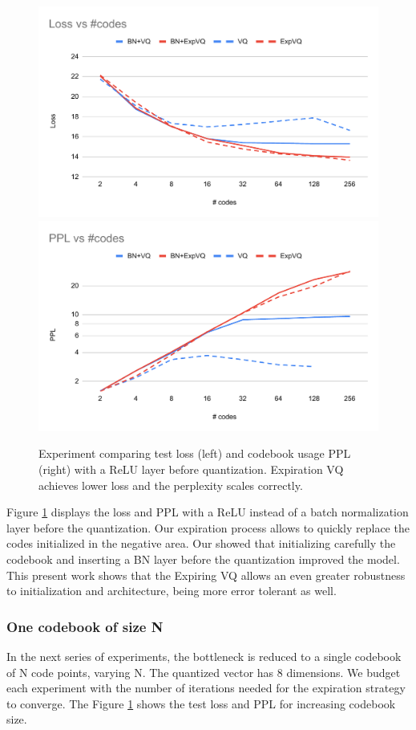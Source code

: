 \begin{figure}
    \centering
    \includegraphics[width=0.45\columnwidth]{60-files/chartloss.pdf}
    \includegraphics[width=0.45\columnwidth]{60-files/chartppl.pdf}
    \caption{Experiment comparing test loss (left) and codebook usage \acf{PPL} (right) with a ReLU layer before quantization. Expiration VQ achieves lower loss and the perplexity scales correctly.}
    \label{fig:agingvq-training-nobn}
\end{figure}

Figure \ref{fig:agingvq-training-nobn} displays the loss and \ac{PPL} with a ReLU instead of a batch normalization layer before the quantization. Our expiration process allows to quickly replace the codes initialized in the negative area. Our \cite{robustvq} showed that initializing carefully the codebook and inserting a BN layer before the quantization improved the model. This present work shows that the Expiring VQ allows an even greater robustness to initialization and architecture, being more error tolerant as well.

\subsubsection{One codebook of size N}

In the next series of experiments, the bottleneck is reduced to a single codebook of N code points, varying N. The quantized vector has 8 dimensions. We budget each experiment with the number of iterations needed for the expiration strategy to converge. The Figure \ref{fig:agingvq-training-nobn} shows the test loss and \ac{PPL} for increasing codebook size.

